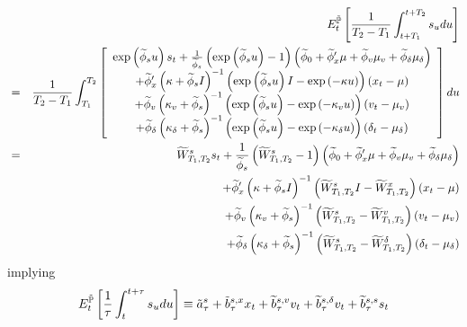 \documentclass{article}
\begin{document}
\begin{eqnarray*}
&&E_{t}^{\mathbb{\tilde{P}}}\left[ \frac{1}{T_{2}-T_{1}}%
\int_{t+T_{1}}^{t+T_{2}}s_{u}du\right] \\
&=&\frac{1}{T_{2}-T_{1}}\int_{T_{1}}^{T_{2}}\left[ 
\begin{array}{c}
\exp \left( \widetilde{\phi }_{s}u\right) s_{t}+\frac{1}{\widetilde{\phi }%
_{s}}\left( \exp \left( \widetilde{\phi }_{s}u\right) -1\right) \left( 
\widetilde{\phi }_{0}+\widetilde{\phi }_{x}^{\prime }\mu +\widetilde{\phi }%
_{v}\mu _{v}+\widetilde{\phi }_{\delta }\mu _{\delta }\right) \\ 
+\widetilde{\phi }_{x}^{\prime }\left( \kappa +\widetilde{\phi }_{s}I\right)
^{-1}\left( \exp \left( \widetilde{\phi }_{s}u\right) I-\exp \left( -\kappa
u\right) \right) \left( x_{t}-\mu \right) \\ 
+\widetilde{\phi }_{v}\left( \kappa _{v}+\widetilde{\phi }_{s}\right)
^{-1}\left( \exp \left( \widetilde{\phi }_{s}u\right) -\exp \left( -\kappa
_{v}u\right) \right) \left( v_{t}-\mu _{v}\right) \\ 
+\widetilde{\phi }_{\delta }\left( \kappa _{\delta }+\widetilde{\phi }%
_{s}\right) ^{-1}\left( \exp \left( \widetilde{\phi }_{s}u\right) -\exp
\left( -\kappa _{\delta }u\right) \right) \left( \delta _{t}-\mu _{\delta
}\right)%
\end{array}%
\right] du \\
&=&\widetilde{W}_{T_{1},T_{2}}^{s}s_{t}+\frac{1}{\widetilde{\phi }_{s}}%
\left( \widetilde{W}_{T_{1},T_{2}}^{s}-1\right) \left( \widetilde{\phi }_{0}+%
\widetilde{\phi }_{x}^{\prime }\mu +\widetilde{\phi }_{v}\mu _{v}+\widetilde{%
\phi }_{\delta }\mu _{\delta }\right) \\
&&+\widetilde{\phi }_{x}^{\prime }\left( \kappa +\widetilde{\phi }%
_{s}I\right) ^{-1}\left( \widetilde{W}_{T_{1},T_{2}}^{s}I-\widetilde{W}%
_{T_{1},T_{2}}^{x}\right) \left( x_{t}-\mu \right) \\
&&+\widetilde{\phi }_{v}\left( \kappa _{v}+\widetilde{\phi }_{s}\right)
^{-1}\left( \widetilde{W}_{T_{1},T_{2}}^{s}-\widetilde{W}_{T_{1},T_{2}}^{v}%
\right) \left( v_{t}-\mu _{v}\right) \\
&&+\widetilde{\phi }_{\delta }\left( \kappa _{\delta }+\widetilde{\phi }%
_{s}\right) ^{-1}\left( \widetilde{W}_{T_{1},T_{2}}^{s}-\widetilde{W}%
_{T_{1},T_{2}}^{\delta }\right) \left( \delta _{t}-\mu _{\delta }\right)
\end{eqnarray*}%
implying%
\begin{equation*}
E_{t}^{\mathbb{\tilde{P}}}\left[ \frac{1}{\tau }\int_{t}^{t+\tau }s_{u}du%
\right] \equiv \tilde{a}_{\tau }^{s}+\tilde{b}_{\tau }^{s,x}x_{t}+\widetilde{%
b}_{\tau }^{s,v}v_{t}+\widetilde{b}_{\tau }^{s,\delta }v_{t}+\widetilde{b}%
_{\tau }^{s,s}s_{t}
\end{equation*}%
\end{document}
